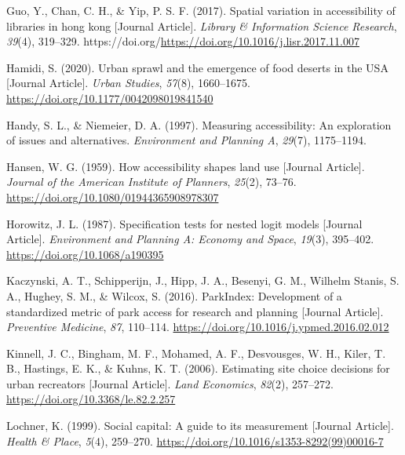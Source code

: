 \documentclass[review, 3p]{elsarticle} %
\newlength{\cslhangindent}
\newlength{\cslentryspacingunit} %
\newenvironment{CSLReferences}[2] %
 {%
  \setlength{\parindent}{0pt}
  \ifodd #1
  \let\oldpar\par
  \def\par{\hangindent=\cslhangindent\oldpar}
  \fi
  \setlength{\parskip}{#2\cslentryspacingunit}
 }%
 {}
\begin{document}
\begin{CSLReferences}{1}{0}
\leavevmode{}%
Guo, Y., Chan, C. H., \& Yip, P. S. F. (2017). Spatial variation in accessibility of libraries in hong kong {[}Journal Article{]}. \emph{Library \& Information Science Research}, \emph{39}(4), 319--329. https://doi.org/\url{https://doi.org/10.1016/j.lisr.2017.11.007}

\leavevmode{}%
Hamidi, S. (2020). Urban sprawl and the emergence of food deserts in the USA {[}Journal Article{]}. \emph{Urban Studies}, \emph{57}(8), 1660--1675. \url{https://doi.org/10.1177/0042098019841540}

\leavevmode{}%
Handy, S. L., \& Niemeier, D. A. (1997). Measuring accessibility: An exploration of issues and alternatives. \emph{Environment and Planning A}, \emph{29}(7), 1175--1194.

\leavevmode{}%
Hansen, W. G. (1959). How accessibility shapes land use {[}Journal Article{]}. \emph{Journal of the American Institute of Planners}, \emph{25}(2), 73--76. \url{https://doi.org/10.1080/01944365908978307}

\leavevmode{}%
Horowitz, J. L. (1987). Specification tests for nested logit models {[}Journal Article{]}. \emph{Environment and Planning A: Economy and Space}, \emph{19}(3), 395--402. \url{https://doi.org/10.1068/a190395}

\leavevmode{}%
Kaczynski, A. T., Schipperijn, J., Hipp, J. A., Besenyi, G. M., Wilhelm Stanis, S. A., Hughey, S. M., \& Wilcox, S. (2016). ParkIndex: Development of a standardized metric of park access for research and planning {[}Journal Article{]}. \emph{Preventive Medicine}, \emph{87}, 110--114. \url{https://doi.org/10.1016/j.ypmed.2016.02.012}

\leavevmode{}%
Kinnell, J. C., Bingham, M. F., Mohamed, A. F., Desvousges, W. H., Kiler, T. B., Hastings, E. K., \& Kuhns, K. T. (2006). Estimating site choice decisions for urban recreators {[}Journal Article{]}. \emph{Land Economics}, \emph{82}(2), 257--272. \url{https://doi.org/10.3368/le.82.2.257}

\leavevmode{}%
Lochner, K. (1999). Social capital: A guide to its measurement {[}Journal Article{]}. \emph{Health \& Place}, \emph{5}(4), 259--270. \url{https://doi.org/10.1016/s1353-8292(99)00016-7}


\end{CSLReferences}
\end{document}
